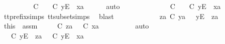 \ \ \ \ \isamarkupfalse%
\ \isamarkupfalse%
\ {\isachardoublequoteopen}{\isasymexists}{\isasymrho}{\isacharprime}{\isachardot}\ {\isasymrho}{\isacharprime}\ {\isasymsubseteq}\isactrlsub C\ {\isasymsigma}{\isacharprime}\ {\isasymand}\ {\isasymrho}{\isacharprime}\ {\isasymle}\isactrlsub C\ {\isacharbrackleft}y{\isacharbrackright}\isactrlsub E\ {\isacharhash}\ xa{\isachardoublequoteclose}\isanewline
\ \ \ \ \isamarkupfalse%
\ auto\isanewline
\ \ \ \ \ \ \isamarkupfalse%
\ {\isachardoublequoteopen}{\isasymsigma}{\isacharprime}\ {\isacharequal}\ {\isacharbrackleft}{\isacharbrackright}\ {\isasymLongrightarrow}\ {\isasymexists}{\isasymrho}{\isacharprime}{\isachardot}\ {\isasymrho}{\isacharprime}\ {\isasymsubseteq}\isactrlsub C\ {\isacharbrackleft}{\isacharbrackright}\ {\isasymand}\ {\isasymrho}{\isacharprime}\ {\isasymle}\isactrlsub C\ {\isacharbrackleft}y{\isacharbrackright}\isactrlsub E\ {\isacharhash}\ xa{\isachardoublequoteclose}\isanewline
\ \ \ \ \ \ \ \ \isamarkupfalse%
\ tt{\isacharunderscore}prefix{\isachardot}simps{\isacharparenleft}{}{\isacharparenright}\ tt{\isacharunderscore}subset{\isachardot}simps{\isacharparenleft}{}{\isacharparenright}\ \isamarkupfalse%
\ blast\isanewline
\ \ \ \ \isamarkupfalse%
\isanewline
\ \ \ \ \ \ \isamarkupfalse%
\ {\isachardoublequoteopen}za\ {\isasymle}\isactrlsub C\ ya{\isachardoublequoteclose}\ {\isachardoublequoteopen}{\isasymsigma}{\isacharprime}\ {\isacharequal}\ {\isacharbrackleft}y{\isacharbrackright}\isactrlsub E\ {\isacharhash}\ za{\isachardoublequoteclose}\isanewline
\ \ \ \ \ \ \isamarkupfalse%
\ this\ \ assm{}\ \isamarkupfalse%
\ {\isasymrho}{\isacharprime}\ \ {\isachardoublequoteopen}{\isasymrho}{\isacharprime}\ {\isasymsubseteq}\isactrlsub C\ za\ {\isasymand}\ {\isasymrho}{\isacharprime}\ {\isasymle}\isactrlsub C\ xa{\isachardoublequoteclose}\isanewline
\ \ \ \ \ \ \ \ \isamarkupfalse%
\ auto\isanewline
\ \ \ \ \ \ \isamarkupfalse%
\ \isamarkupfalse%
\ {\isachardoublequoteopen}{\isasymexists}{\isasymrho}{\isacharprime}{\isachardot}\ {\isasymrho}{\isacharprime}\ {\isasymsubseteq}\isactrlsub C\ {\isacharbrackleft}y{\isacharbrackright}\isactrlsub E\ {\isacharhash}\ za\ {\isasymand}\ {\isasymrho}{\isacharprime}\ {\isasymle}\isactrlsub C\ {\isacharbrackleft}y{\isacharbrackright}\isactrlsub E\ {\isacharhash}\ xa{\isachardoublequoteclose}\isanewline

